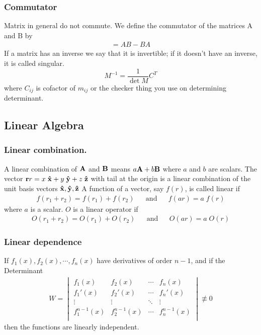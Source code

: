 \documentclass[../main.tex]{subfiles}
\begin{document}
\subsubsection*{Commutator}Matrix in general do not commute. We define the commutator of the matrices A and B by
\begin{align*}
    [A, B] = AB - BA
\end{align*}
If a matrix has an inverse we say that it is invertible; if it doesn't have an inverse, it is called singular. 
\begin{equation*}
    M^{-1}=\frac{1}{\det M}C^{T}
\end{equation*}
where $C_{ij}$ is cofactor of $m_{ij}$ or the checker thing you use on determining determinant.


\subsection*{Linear Algebra}
\subsubsection*{Linear combination.} A linear combination of $\mathbf{A}$ and $\mathbf{B}$ means $a\mathbf{A} + b\mathbf{B}$ where $a$ and $b$ are scalars.
The vector $\mathbf{r}r = x\;\mathbf{\hat{x}}+y\;\mathbf{\hat{y}}+z\;\mathbf{\hat{z}}$ with tail at the origin is a linear combination of the unit basis vectors $\mathbf{\hat{x}},\mathbf{\hat{y}},\mathbf{\hat{z}}$
A function of a vector, say $f (r)$, is called linear if
\begin{align*}
    f(r_1+r_2)= f(r_1)+ f(r_2)&&\mathrm{and}&&f(ar)=a\;f(r)
\end{align*}
where $a$ is a scalar. $O$ is a linear operator if
\begin{align*}
    O(r_1+r_2)= O(r_1)+ O(r_2)&&\mathrm{and}&&O(ar)=a\;O(r)
\end{align*}

\subsubsection*{Linear dependence}If $f_1(x), f_2(x),\cdots, f_n(x)$ have derivatives of order $n - 1$, and if the Determinant
\begin{align*}
    W=\begin{vmatrix}
        f_1(x)& f_2(x)&\cdots& f_n(x)\\
        f_1'(x)& f_2'(x)&\cdots& f_n'(x)\\
        \vdots&\vdots&\ddots& \vdots\\
        f_1^{n-1}(x)& f_2^{n-1}(x)&\cdots& f_n^{n-1}(x)\\
    \end{vmatrix}\not\equiv0
\end{align*}then the functions are linearly independent.
\end{document}
